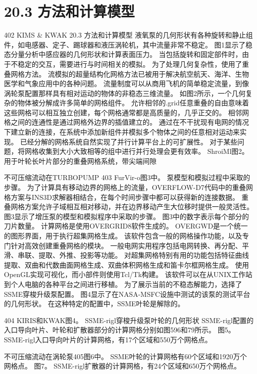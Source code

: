 \documentclass[UTF8,11pt,a4paper,openany,fontset=fandol]{ctexbook}
\begin{document}
\section{20.3 方法和计算模型}
402 KIMS \& KWAK 20.3 方法和计算模型 液氧泵的几何形状有各种旋转和静止组件，如电感器、定子、踢球器和液压涡轮机，其中流量非常不稳定。 图1显示了稳态分量分析中感应器的几何形状和计算表面压力。 当包括旋转和固定部件时，由于不稳定的交互，需要进行与时间相关的模拟。 为了处理几何复杂性，使用了重叠网格方法。 流模拟的超量结构化网格方法已被用于解决航空航天、海洋、生物医学和气象应用中的各种问题。 流量制度可以从商用飞机的简单稳定流量，到像涡轮泵配置那样具有相对运动的物体的非稳态三维流量。 如图2所示，一个几何复杂的物体被分解成许多简单的网格组件。 允许相邻的.grid任意重叠的自由意味着这些网格可以相互独立创建，每个网格通常都是高质量的，几乎正交的。 相邻网格之间的连通性是通过网格外边界的插值建立的。 通过在不干扰现有电网的情况下建立新的连接，在系统中添加新组件并模拟多个物体之间的任意相对运动来实现。 已经分解的网格系统自然实现了并行计算平台上的可扩展性。 对于某些问题，将网格收集到大小大致相等的组中进行并行处理会更有效率。 ShroiMl图2。 用于叶轮长叶片部分的重叠网格系统，带尖端间隙

不可压缩流动在TURBOPUMP 403 FurVir-o图3中。 泵模型和模拟过程中采取的步骤。 为了计算具有移动边界的网格上的流量，OVERFLOW-D7代码中的重叠网格方案与INS3D求解器相结合，在每个时间步骤中都可以获得新的连接数据。 重叠网格方案允许子域相互相对移动，并在边界移动产生大位移时提供一般灵活性。 图3显示了增压泵的模型和模拟程序中采取的步骤。 图3中的数字表示每个部分的刀片数量。 计算网格是使用OVERGRID8软件生成的。 OVERGWD是一个统一的图形界面，用于执行超集网格生成。 该软件包含一般的网格操作功能，以及专门针对高效创建重叠网格的模块。 一般电网实用程序包括电网转换、再分配、平滑、串联、提取、外推、投影等功能。 对超集网格特别有用的功能包括特征曲线提取、双曲和代数曲面网格生成、双曲体积网格生成和笛卡尔框网格生成。 使用OpenGL实现可视化，而小部件则使用Tcl/Tk构建。 该软件可以在从UNIX工作站到个人电脑的各种平台之间进行移植。 为了展示当前的不稳态解能力，选择了SSME穿梭升级泵配置。 图4显示了在NASA-MSFC设施中测试的该泵的测试平台的几何形状。 在这种特定的配置中，SSME叶轮是解除的。

404 KIRIS和KWAK图4。 SSME-rigl穿梭升级泵叶轮的几何形状 SSME-rigl配置的入口导向叶片、叶轮和扩散器部分的计算网格分别如图596和79所示。 图5。 SSME-rigl入口导向叶片的计算网格，有17个区域和550万个网格点。

不可压缩流动在涡轮泵405图6中。 SSME叶轮的计算网格有60个区域和1920万个网格点。 图7。 SSME-rigl扩散器的计算网格，有24个区域和650万个网格点。
\end{document}
